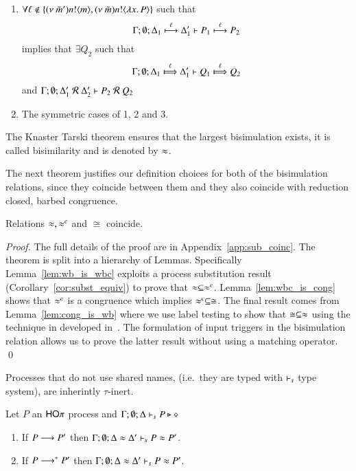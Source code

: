 \begin{definition}[Bisimulation]
\begin{enumerate}
		\item	$\forall \ell \notin \set{\news{\tilde{m}'} \bactout{n}{m}, \news{\tilde{m}} \bactout{n}{\abs{x}{P}}}$ such that
			\[
				\horel{\Gamma}{\Delta_1}{P_1}{\hby{\ell}}{\Delta_1'}{P_2}
			\]
			implies that $\exists Q_2$ such that 
			\[
				\horel{\Gamma}{\Delta_1}{Q_1}{\Hby{\ell}}{\Delta_1'}{Q_2}
			\]
			and
			$\horel{\Gamma}{\Delta_1'}{P_2}{\ \mathcal{R}\ }{\Delta_2'}{Q_2}$

		\item	The symmetric cases of 1, 2 and 3.
	\end{enumerate}
	The Knaster Tarski theorem ensures that the largest bisimulation exists,
	it is called bisimilarity and is denoted by $\wb$.
\end{definition}

The next theorem justifies our definition choices
for both of the bisimulation relations, since
they coincide between them and they also
coincide with reduction closed, barbed congruence.

\begin{theorem}[Coincidence]\rm
	\label{the:coincidence}
	Relations $\wb, \wbc$ and $\cong$ coincide.
\end{theorem}

\begin{proof}
	The full details of the proof are in Appendix~\ref{app:sub_coinc}.
	The theorem is split into a hierarchy of Lemmas. Specifically
	Lemma~\ref{lem:wb_is_wbc} exploits a process substitution result
	(Corollary~\ref{cor:subst_equiv}) to prove that $\wb \subseteq \wbc$.
	Lemma~\ref{lem:wbc_is_cong} shows that $\wbc$ is a congruence
	which implies $\wbc \subseteq \cong$.
	The final result comes from Lemma~\ref{lem:cong_is_wb} where
	we use label testing to show that $\cong \subseteq \wb$ using
	the technique in developed in~\cite{Hennessy07}. The formulation of input
	triggers in the bisimulation relation allows us to prove
	the latter result without using a matching operator.
	\qed
\end{proof}

Processes that do not use shared names, (i.e.~they are typed with
$\proves_s$ type system), are inherintly $\tau$-inert.

\begin{lemma}\rm
	\label{lem:tau_inert}
	Let $P$ an $\HOp$ process
	and $\Gamma; \emptyset; \Delta \proves_s P \hastype \Proc$
	\begin{enumerate}
		\item	If $P \red P'$ then $\Gamma; \es; \Delta \wb \Delta' \proves_s P \wb P'$.
		\item	If $P \red^* P'$ then $\Gamma; \es; \Delta \wb \Delta' \proves_s P \wb P'$.
	\end{enumerate}
\end{lemma}

